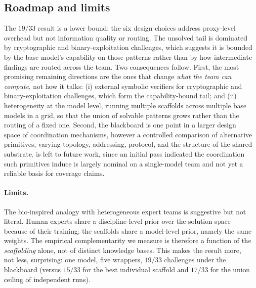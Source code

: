 \subsection{Roadmap and limits}\label{sec:bbbeyond}

The $19/33$ result is a lower bound: the six design choices address proxy-level overhead but not information quality or routing. The unsolved tail is dominated by cryptographic and binary-exploitation challenges, which suggests it is bounded by the base model's capability on those patterns rather than by how intermediate findings are routed across the team. Two consequences follow. First, the most promising remaining directions are the ones that change \emph{what the team can compute}, not how it talks: (i) external symbolic verifiers for cryptographic and binary-exploitation challenges, which form the capability-bound tail; and (ii) heterogeneity at the model level, running multiple scaffolds across multiple base models in a grid, so that the union of solvable patterns grows rather than the routing of a fixed one. Second, the blackboard is one point in a larger design space of coordination mechanisms, however a controlled comparison of alternative primitives, varying topology, addressing, protocol, and the structure of the shared substrate, is left to future work, since an initial pass indicated the coordination such primitives induce is largely nominal on a single-model team and not yet a reliable basis for coverage claims.

\paragraph{Limits.}\label{sec:limits}

The bio-inspired analogy with heterogeneous expert teams is suggestive but not literal. Human experts share a discipline-level prior over the solution space because of their training; the scaffolds share a model-level prior, namely the same \aliasmini{} weights. The empirical complementarity we measure is therefore a function of the \emph{scaffolding} alone, not of distinct knowledge bases. This makes the result more, not less, surprising: one model, five wrappers, $19/33$ challenges under the blackboard (versus $15/33$ for the best individual scaffold and $17/33$ for the union ceiling of independent runs).
